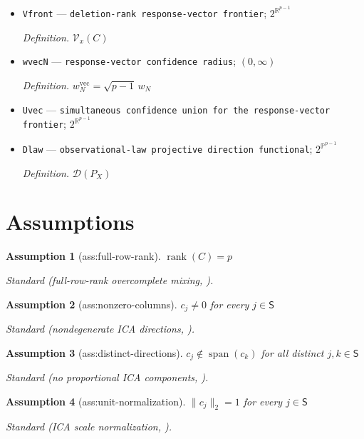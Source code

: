 \documentclass{article}
\newtheorem{assumption}{Assumption}
\begin{document}
\begin{itemize}
  \par\smallskip\noindent\emph{Definition.} \(\rho_x(\widetilde{\mathcal M})\)
  \item \texttt{Vfront} --- \texttt{deletion-\allowbreak{}rank response-\allowbreak{}vector frontier}; \(2^{\mathbb R^{p-1}}\)
  \par\smallskip\noindent\emph{Definition.} \(\mathcal V_x(C)\)
  \item \texttt{wvecN} --- \texttt{response-\allowbreak{}vector confidence radius}; \((0,\infty)\)
  \par\smallskip\noindent\emph{Definition.} \(w_N^{\mathrm{vec}}=\sqrt{p-1}\,w_N\)
  \item \texttt{Uvec} --- \texttt{simultaneous confidence union for the response-\allowbreak{}vector frontier}; \(2^{\mathbb R^{p-1}}\)
  \item \texttt{Dlaw} --- \texttt{observational-\allowbreak{}law projective direction functional}; \(2^{\mathbb P^{p-1}}\)
  \par\smallskip\noindent\emph{Definition.} \(\mathcal D(P_X)\)
\end{itemize}

\section{Assumptions}

\begin{assumption}[ass:full-row-rank]\label{ass:full-row-rank}
\(\operatorname{rank}(C)=p\)
\par\smallskip\noindent\emph{Standard} (full-row-rank overcomplete mixing, \cite{WangSeigal2026}).
\end{assumption}

\begin{assumption}[ass:nonzero-columns]\label{ass:nonzero-columns}
\(c_j\ne0\) for every \(j\in\mathsf S\)
\par\smallskip\noindent\emph{Standard} (nondegenerate ICA directions, \cite{WangSeigal2026}).
\end{assumption}

\begin{assumption}[ass:distinct-directions]\label{ass:distinct-directions}
\(c_j\notin\operatorname{span}(c_k)\) for all distinct \(j,k\in\mathsf S\)
\par\smallskip\noindent\emph{Standard} (no proportional ICA components, \cite{WangSeigal2026}).
\end{assumption}

\begin{assumption}[ass:unit-normalization]\label{ass:unit-normalization}
\(\lVert c_j\rVert_2=1\) for every \(j\in\mathsf S\)
\par\smallskip\noindent\emph{Standard} (ICA scale normalization, \cite{Comon1994}).
\end{assumption}
\end{document}
